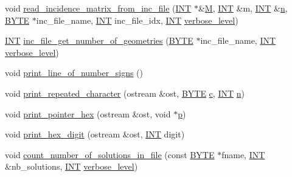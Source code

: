\begin{DoxyCompactItemize}
\item 
void \mbox{\hyperlink{util_8_c_abcf0cb14cb6873ca687baa4711c96f29}{read\+\_\+incidence\+\_\+matrix\+\_\+from\+\_\+inc\+\_\+file}} (\mbox{\hyperlink{galois_8h_a09fddde158a3a20bd2dcadb609de11dc}{I\+NT}} $\ast$\&\mbox{\hyperlink{plane__search_8_c_ad2d23ebd03187a91edd45b1d5e496265}{M}}, \mbox{\hyperlink{galois_8h_a09fddde158a3a20bd2dcadb609de11dc}{I\+NT}} \&m, \mbox{\hyperlink{galois_8h_a09fddde158a3a20bd2dcadb609de11dc}{I\+NT}} \&\mbox{\hyperlink{simeon_8_c_a7f2cd26777ce0ff3fdaf8d02aacbddfb}{n}}, \mbox{\hyperlink{galois_8h_ab6cc7b4aeb6ea31aba2b3fbfc83ff5e6}{B\+Y\+TE}} $\ast$inc\+\_\+file\+\_\+name, \mbox{\hyperlink{galois_8h_a09fddde158a3a20bd2dcadb609de11dc}{I\+NT}} inc\+\_\+file\+\_\+idx, \mbox{\hyperlink{galois_8h_a09fddde158a3a20bd2dcadb609de11dc}{I\+NT}} \mbox{\hyperlink{simeon_8_c_a818073fbcc2f439e7c56952f67386122}{verbose\+\_\+level}})
\item 
\mbox{\hyperlink{galois_8h_a09fddde158a3a20bd2dcadb609de11dc}{I\+NT}} \mbox{\hyperlink{util_8_c_a365e5dc13a95b627c296e1715f4517d3}{inc\+\_\+file\+\_\+get\+\_\+number\+\_\+of\+\_\+geometries}} (\mbox{\hyperlink{galois_8h_ab6cc7b4aeb6ea31aba2b3fbfc83ff5e6}{B\+Y\+TE}} $\ast$inc\+\_\+file\+\_\+name, \mbox{\hyperlink{galois_8h_a09fddde158a3a20bd2dcadb609de11dc}{I\+NT}} \mbox{\hyperlink{simeon_8_c_a818073fbcc2f439e7c56952f67386122}{verbose\+\_\+level}})
\item 
void \mbox{\hyperlink{util_8_c_a59b640c1f8b0040f26fa06b641191105}{print\+\_\+line\+\_\+of\+\_\+number\+\_\+signs}} ()
\item 
void \mbox{\hyperlink{util_8_c_aadbeed81821ddead32a04006dc872fa2}{print\+\_\+repeated\+\_\+character}} (ostream \&ost, \mbox{\hyperlink{galois_8h_ab6cc7b4aeb6ea31aba2b3fbfc83ff5e6}{B\+Y\+TE}} \mbox{\hyperlink{alphabet2_8_c_a4e1e0e72dd773439e333c84dd762a9c3}{c}}, \mbox{\hyperlink{galois_8h_a09fddde158a3a20bd2dcadb609de11dc}{I\+NT}} \mbox{\hyperlink{simeon_8_c_a7f2cd26777ce0ff3fdaf8d02aacbddfb}{n}})
\item 
void \mbox{\hyperlink{util_8_c_a32add94de62a1d910cc0fc35ed90ab48}{print\+\_\+pointer\+\_\+hex}} (ostream \&ost, void $\ast$\mbox{\hyperlink{alphabet2_8_c_a533391314665d6bf1b5575e9a9cd8552}{p}})
\item 
void \mbox{\hyperlink{util_8_c_a36c64a828eefed0a0cfdd6186ec92c31}{print\+\_\+hex\+\_\+digit}} (ostream \&ost, \mbox{\hyperlink{galois_8h_a09fddde158a3a20bd2dcadb609de11dc}{I\+NT}} digit)
\item 
void \mbox{\hyperlink{util_8_c_a540ec142294ad413a7dd9bdff8d5ea1a}{count\+\_\+number\+\_\+of\+\_\+solutions\+\_\+in\+\_\+file}} (const \mbox{\hyperlink{galois_8h_ab6cc7b4aeb6ea31aba2b3fbfc83ff5e6}{B\+Y\+TE}} $\ast$fname, \mbox{\hyperlink{galois_8h_a09fddde158a3a20bd2dcadb609de11dc}{I\+NT}} \&nb\+\_\+solutions, \mbox{\hyperlink{galois_8h_a09fddde158a3a20bd2dcadb609de11dc}{I\+NT}} \mbox{\hyperlink{simeon_8_c_a818073fbcc2f439e7c56952f67386122}{verbose\+\_\+level}})

\end{DoxyCompactItemize}
